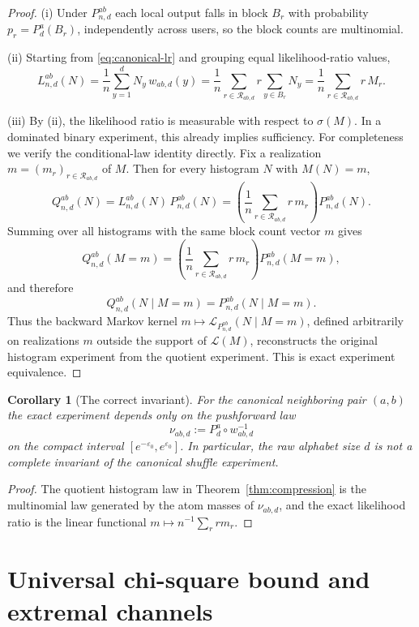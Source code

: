 \documentclass[11pt]{amsart}
\numberwithin{equation}{section}
\newtheorem{corollary}[theorem]{Corollary}
\theoremstyle{definition}
\newcommand{\law}{\mathcal L}
\begin{document}
\begin{proof}
(i)  Under $P_{n,d}^{ab}$ each local output falls in block $B_r$ with probability
\(
p_r=P_d^a(B_r)
\),
independently across users, so the block counts are multinomial.

(ii)  Starting from \eqref{eq:canonical-lr} and grouping equal likelihood-ratio values,
\[
L_{n,d}^{ab}(N)
=
\frac1n \sum_{y=1}^d N_y\,w_{ab,d}(y)
=
\frac1n \sum_{r\in\mathcal R_{ab,d}} r\sum_{y\in B_r}N_y
=
\frac1n \sum_{r\in\mathcal R_{ab,d}} r\,M_r.
\]

(iii)  By (ii), the likelihood ratio is measurable with respect to $\sigma(M)$.
In a dominated binary experiment, this already implies sufficiency.  For completeness we verify the
conditional-law identity directly.
Fix a realization $m=(m_r)_{r\in\mathcal R_{ab,d}}$ of $M$.
Then for every histogram $N$ with $M(N)=m$,
\[
Q_{n,d}^{ab}(N)=L_{n,d}^{ab}(N)\,P_{n,d}^{ab}(N)
=
\left(\frac1n\sum_{r\in\mathcal R_{ab,d}}r\,m_r\right) P_{n,d}^{ab}(N).
\]
Summing over all histograms with the same block count vector $m$ gives
\[
Q_{n,d}^{ab}(M=m)
=
\left(\frac1n\sum_{r\in\mathcal R_{ab,d}}r\,m_r\right)P_{n,d}^{ab}(M=m),
\]
and therefore
\[
Q_{n,d}^{ab}(N\mid M=m)=P_{n,d}^{ab}(N\mid M=m).
\]
Thus the backward Markov kernel $m\mapsto \law_{P_{n,d}^{ab}}(N\mid M=m)$, defined arbitrarily on
realizations $m$ outside the support of $\law(M)$, reconstructs the original
histogram experiment from the quotient experiment.  This is exact experiment equivalence.
\end{proof}

\begin{corollary}[The correct invariant]\label{cor:correct-invariant}
For the canonical neighboring pair $(a,b)$ the exact experiment depends only on the pushforward law
\[
\nu_{ab,d}:=P_d^a \circ w_{ab,d}^{-1}
\]
on the compact interval $[e^{-\varepsilon_0},e^{\varepsilon_0}]$.
In particular, the raw alphabet size $d$ is not a complete invariant of the canonical shuffle experiment.
\end{corollary}

\begin{proof}
The quotient histogram law in Theorem~\ref{thm:compression} is the multinomial law generated by the
atom masses of $\nu_{ab,d}$, and the exact likelihood ratio is the linear functional
\(
m \mapsto n^{-1}\sum_r r m_r
\).
\end{proof}

\section{Universal chi-square bound and extremal channels}
\end{document}
